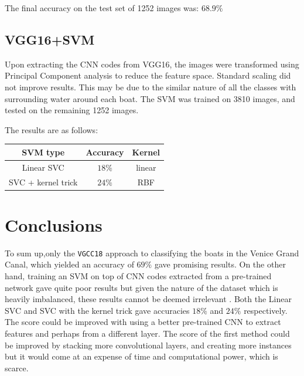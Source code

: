 \documentclass[12pt,a4paper]{article}
\begin{document}
The final accuracy on the test set of 1252 images was: $68.9 \%$
\subsection{VGG16+SVM}

Upon extracting the CNN codes from VGG16, the images were transformed using Principal Component analysis to reduce the feature space. Standard scaling did not improve results. This may be due to the similar nature of all the classes with surrounding water around each boat. The SVM was trained on 3810 images, and tested on the remaining 1252 images. 

The results are as follows:

\begin{table}[h]
\begin{tabular}{|c|c|c|}
\hline
SVM type           & Accuracy & Kernel \\ \hline
Linear SVC         & $18 \%$  & linear \\ \hline
SVC + kernel trick & $24 \%$  & RBF    \\ \hline
\end{tabular}
\end{table}

\section{Conclusions}
To sum up,only the \texttt{VGCC18} approach to classifying the boats in the Venice Grand Canal, which yielded an accuracy of $69\%$ gave promising results. On the other hand, training an SVM on top of CNN codes extracted from a pre-trained network gave quite poor results but given the nature of the dataset which is heavily imbalanced, these results cannot be deemed irrelevant . Both the Linear SVC and SVC with the kernel trick gave accuracies $18 \%$ and $24 \%$ respectively. The score could be improved with using a better pre-trained CNN to extract features and perhaps from a different layer. The score of the first method could be improved by stacking more convolutional layers, and creating more instances but it would come at an expense of time and computational power, which is scarce.
\end{document}
